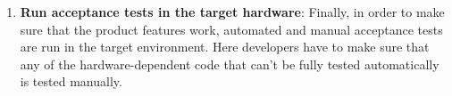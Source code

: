 \begin{enumerate}
    \item \textbf{Run acceptance tests in the target hardware}: Finally, in order to make sure that the product features work, automated and manual acceptance tests are run in the target environment. Here developers have to make sure that any of the hardware-dependent code that can't be fully tested automatically is tested manually.
\end{enumerate}